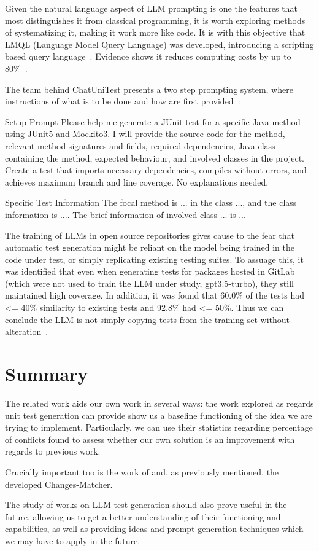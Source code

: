Given the natural language aspect of LLM prompting is one the features that most distinguishes it from classical programming, it is worth exploring methods of systematizing it, making it work more like code. It is with this objective that LMQL (Language Model Query Language) was developed, introducing a scripting based query language~\cite{kn:lmql}. Evidence shows it reduces computing costs by up to 80\%~\cite{kn:lmql}.

The team behind ChatUniTest presents a two step prompting system, where instructions of what is to be done and how are first provided~\cite{kn:chatunitest}:

\begin{prompt}
Setup Prompt
Please help me generate a JUnit test for a specific Java method using JUnit5 and Mockito3.
I will provide the source code for the method, relevant method signatures and fields, required dependencies, Java class containing the method, expected behaviour, and involved classes in the project.
Create a test that imports necessary dependencies, compiles without errors, and achieves maximum branch and line coverage. 
No explanations needed. 

Specific Test Information
The focal method is ... in the class ..., and the class information is .... The brief information of involved class ... is ...   
\end{prompt}


The training of LLMs in open source repositories gives cause to the fear that automatic test generation might be reliant on the model being trained in the code under test, or simply replicating existing testing suites. To assuage this, it was identified that even when generating tests for packages hosted in GitLab (which were not used to train the LLM under study, gpt3.5-turbo), they still maintained high coverage. In addition, it was found that 60.0\% of the tests had <= 40\% similarity to existing tests and 92.8\% had <= 50\%. Thus we can conclude the LLM is not simply copying tests from the training set without alteration~\cite{kn:max}.


\section{Summary}

The related work aids our own work in several ways: the work explored as regards unit test generation can provide show us a baseline functioning of the idea we are trying to implement. Particularly, we can use their statistics regarding percentage of conflicts found to assess whether our own solution is an improvement with regards to previous work.

Crucially important too is the work of \citet{kn:nuno} and, as previously mentioned, the developed Changes-Matcher.

The study of works on LLM test generation should also prove useful in the future, allowing us to get a better understanding of their functioning and capabilities, as well as providing ideas and prompt generation techniques which we may have to apply in the future.
